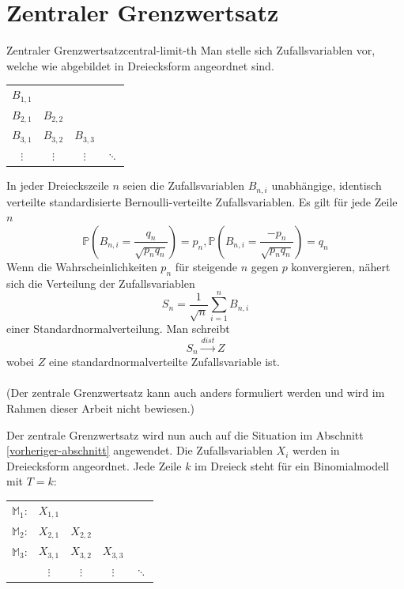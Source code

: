 \documentclass[11pt]{report} %
\begin{document}
\section{Zentraler Grenzwertsatz}
\begin{Theorem}{Zentraler Grenzwertsatz}{central-limit-th}
Man stelle sich Zufallsvariablen vor, welche wie abgebildet in Dreiecksform angeordnet sind. 
    \begin{center}
    \begin{tabular}{ c c c c }
         $B_{1, 1}$ &  &  \\ 
         $B_{2, 1}$ & $B_{2, 2}$ & \\  
         $B_{3, 1}$ & $B_{3, 2}$ & $B_{3, 3}$\\
         $\vdots$ & $\vdots$ & $\vdots$ & $\ddots$
    \end{tabular}
\end{center}
In jeder Dreieckszeile $n$ seien die Zufallsvariablen $B_{n, i}$ unabhängige, identisch verteilte standardisierte Bernoulli-verteilte Zufallsvariablen. Es gilt für jede Zeile $n$
$$\mathbb{P}\left(B_{n, i}=\frac{q_n}{\sqrt{p_nq_n}}\right)=p_n, \mathbb{P}\left(B_{n, i}=\frac{-p_n}{\sqrt{p_nq_n}}\right)=q_n$$Wenn die Wahrscheinlichkeiten $p_n$ für steigende $n$ gegen $p$ konvergieren, nähert sich die Verteilung der Zufallsvariablen $$S_n=\frac{1}{\sqrt{n}}\sum_{i=1}^{n}B_{n, i}$$ einer Standardnormalverteilung.
Man schreibt $$S_n\xrightarrow{dist}Z$$ wobei $Z$ eine standardnormalverteilte Zufallsvariable ist.\\\\(Der zentrale Grenzwertsatz kann auch anders formuliert werden und wird im Rahmen dieser Arbeit nicht bewiesen.)
\end{Theorem}
Der zentrale Grenzwertsatz wird nun auch auf die Situation im Abschnitt \ref{vorheriger-abschnitt} angewendet. Die Zufallsvariablen $X_i$ werden in Dreiecksform angeordnet. Jede Zeile $k$ im Dreieck steht für ein Binomialmodell mit $T=k$:
    \begin{center}
    \begin{tabular}{ c c c c c }
         $\mathbb{M}_1$: & $X_{1, 1}$ &  &  \\ 
         $\mathbb{M}_2$: & $X_{2, 1}$ & $X_{2, 2}$ & \\  
         $\mathbb{M}_3$: & $X_{3, 1}$ & $X_{3, 2}$ & $X_{3, 3}$\\
         &$\vdots$ & $\vdots$ & $\vdots$ & $\ddots$
    \end{tabular}
\end{center}
\end{document}

